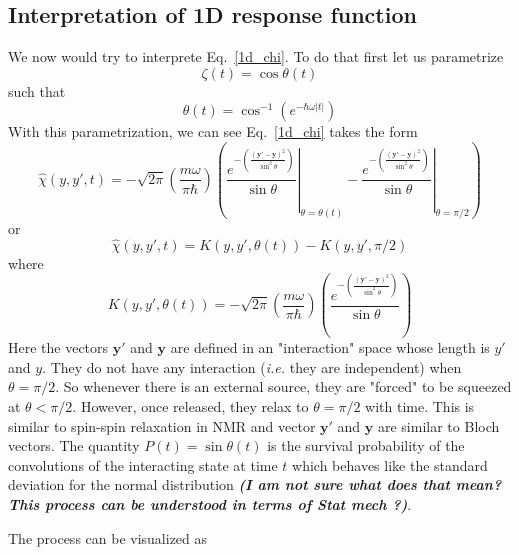 \documentclass{article}
\newcommand{\eq}{\begin{equation}}
\newcommand{\qe}{\end{equation}}
\newcommand{\abs}[1]{\vert #1\vert}
\newcommand{\ie}{\emph{i.e. }}
\begin{document}
\subsection{Interpretation of 1D response function}
We now would try to interprete Eq.~\eqref{1d_chi}. To do that first let us parametrize
\eq
 \zeta(t)= \cos \theta(t)
\qe 
such that 
\eq
 \theta(t) = \cos^{-1} (e^{-\hbar \omega \abs{t}})
\qe
 With this parametrization, we can see Eq.~\eqref{1d_chi} takes the form 
\eq\label{1d_chi_theta}
\hat{\chi}(y, y', t)=-\sqrt{2\pi}\left( \frac{m \omega}{\pi \hbar}\right) \left(\left. \frac{e^{-\left(\frac{(\mathbf{y}'-\mathbf{y})^{2}}{\sin^2 \theta}\right)}}{\sin \theta}\right \rvert_{\theta=\theta(t)}- \left. \frac{e^{-\left(\frac{(\mathbf{y}'-\mathbf{y})^{2}}{\sin^2 \theta}\right)}}{\sin \theta} \right \rvert_{\theta=\pi/2}\right)
\qe
or 
\eq
\hat{\chi}(y, y', t)= K(y, y', \theta(t))- K(y, y', \pi/2)
\qe
where 
\eq
K(y, y', \theta(t)) = -\sqrt{2\pi}\left( \frac{m \omega}{\pi \hbar}\right) \left( \frac{e^{-\left(\frac{(\mathbf{y}'-\mathbf{y})^{2}}{\sin^2 \theta}\right)}}{\sin \theta}\right)
\qe
Here the vectors $\mathbf{y}'$ and $\mathbf{y}$ are defined in an "interaction" space whose length is $y'$ and $y$. They do not have any interaction (\ie they are independent) when $\theta = \pi/2$. So whenever there is an external source, they are "forced" to be squeezed at $\theta < \pi/2$. However, once released, they relax to $\theta = \pi/2$ with time. This is similar to spin-spin relaxation in NMR and vector $\mathbf{y}'$ and $\mathbf{y}$ are similar to Bloch vectors. The quantity $P(t) = \sin \theta(t)$ is the survival probability of the convolutions of the interacting state at time $t$ which behaves like the standard deviation for the normal distribution \textbf{\emph{(I am not sure what does that mean? This process can be understood in terms of Stat mech ?)}}. 

The process can be visualized as 
\end{document}
